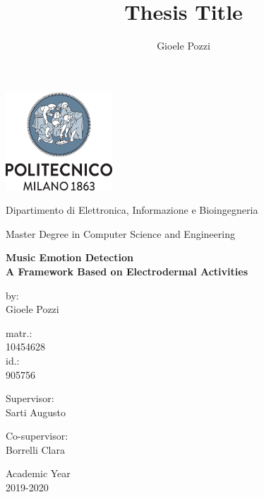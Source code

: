\documentclass[oneside]{book}
\author{Gioele Pozzi}
\title{Thesis Title}
\begin{document}
\centering
\includegraphics[width=4cm]{../img/logo_polimi.png}

\vspace{1cm}
Dipartimento di Elettronica, Informazione e Bioingegneria

\vspace{0.25cm}
Master Degree in Computer Science and Engineering

\vspace{2cm}
\centering

\color{BrickRed}
\Huge
\textbf{
Music Emotion Detection \\%
\Large A Framework Based on Electrodermal Activities}

\normalsize
\vspace{2cm}
\color{black}
\flushright
by:\\Gioele Pozzi

\vspace{0.5cm}
matr.:\\10454628 \\
id.:\\905756

\vspace{0.5cm}
\flushleft
Supervisor:\\ Sarti Augusto

\vspace{0.5cm}
Co-supervisor:\\ Borrelli Clara



\vfill
\centering
Academic Year \\ 2019-2020

\end{document}
